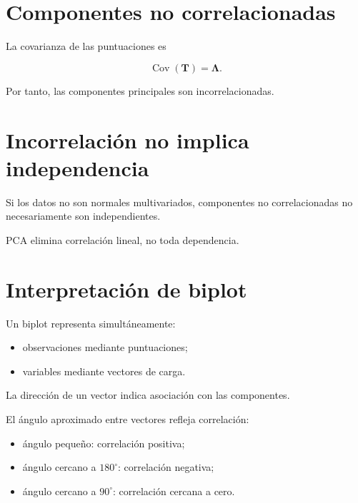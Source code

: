 \documentclass[
  spanish,
  10.5pt,
  letterpaper,
  DIV=11,
  numbers=noendperiod,
  oneside,
  open=any]{scrreprt}
\providecommand{\tightlist}{%
  \setlength{\itemsep}{0pt}\setlength{\parskip}{0pt}}
\theoremstyle{definition}
\theoremstyle{definition}
\theoremstyle{plain}
\theoremstyle{remark}
\begin{document}
\section*{Componentes no
correlacionadas}\label{componentes-no-correlacionadas}


La covarianza de las puntuaciones es

\[
\operatorname{Cov}(\mathbf{T})
=
\boldsymbol{\Lambda}.
\]

Por tanto, las componentes principales son incorrelacionadas.

\section*{Incorrelación no implica
independencia}\label{incorrelaciuxf3n-no-implica-independencia}


Si los datos no son normales multivariados, componentes no
correlacionadas no necesariamente son independientes.

PCA elimina correlación lineal, no toda dependencia.

\section*{\texorpdfstring{Interpretación de
biplot}{Interpretación de biplot}}\label{interpretaciuxf3n-de-biplot}


Un biplot representa simultáneamente:

\begin{itemize}
\tightlist
\item
  observaciones mediante puntuaciones;
\item
  variables mediante vectores de carga.
\end{itemize}

La dirección de un vector indica asociación con las componentes.

El ángulo aproximado entre vectores refleja correlación:

\begin{itemize}
\tightlist
\item
  ángulo pequeño: correlación positiva;
\item
  ángulo cercano a \(180^\circ\): correlación negativa;
\item
  ángulo cercano a \(90^\circ\): correlación cercana a cero.
\end{itemize}
\end{document}
